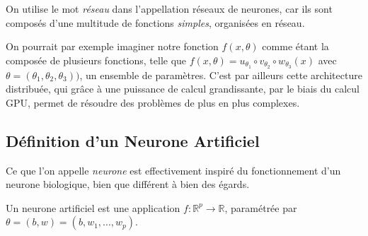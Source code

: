 \documentclass[a4paper, 11pt]{report}
\begin{document}
On utilise le mot \emph{réseau} dans l’appellation réseaux de neurones, car ils sont composés d'une multitude de fonctions \emph{simples}, organisées en réseau.

On pourrait par exemple imaginer notre fonction $f(x,\theta)$ comme étant la composée de plusieurs fonctions, telle que $f(x,\theta) = u_{\theta_1} \circ v_{\theta_2} \circ w_{\theta_3}(x)$ avec $\theta = (\theta_1,\theta_2, \theta_3))$, un ensemble de paramètres.
C'est par ailleurs cette architecture distribuée, qui grâce à une puissance de calcul grandissante, par le biais du calcul GPU, permet de résoudre des problèmes de plus en plus complexes.
\subsection{Définition d'un Neurone Artificiel}
Ce que l'on appelle \emph{neurone} est effectivement inspiré du fonctionnement d'un neurone biologique, bien que différent à bien des égards.

Un neurone artificiel est une application $f : \mathbb{R}^p \rightarrow \mathbb{R}$, paramétrée par $\theta = (b,w) = (b, w_1, ..., w_p)$.
\end{document}
